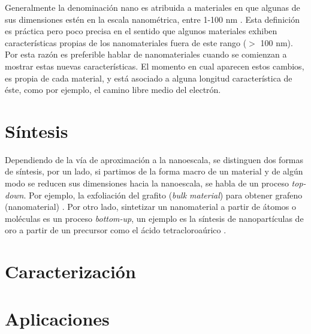 
Generalmente la denominación nano es atribuida a materiales en que algunas de sus dimensiones estén en la escala nanométrica, entre 1-100 nm \citep{Gressler2013}. Esta definición es práctica pero poco precisa en el sentido que algunos materiales exhiben características propias de los nanomateriales fuera de este rango ($>$ 100 nm). Por esta razón es preferible hablar de nanomateriales cuando se comienzan a mostrar estas nuevas características. El momento en cual aparecen estos cambios, es propia de cada material, y está asociado a alguna longitud característica de éste, como por ejemplo, el camino libre medio del electrón.

\section{Síntesis}
Dependiendo de la vía de aproximación a la nanoescala, se distinguen dos formas de síntesis, por un lado, si partimos de la forma macro de un material y de algún modo se reducen sus dimensiones hacia la nanoescala, se habla de un proceso \textit{top-down}. Por ejemplo, la exfoliación del grafito (\textit{bulk material}) para obtener grafeno (nanomaterial) \citep{Novoselov2004}.  Por otro lado, sintetizar un nanomaterial a partir de átomos o moléculas es un proceso \textit{bottom-up}, un ejemplo es la síntesis de nanopartículas de oro a partir de un precursor como el ácido tetracloroaúrico \citep{Daniel2004}.

\section{Caracterización}


\section{Aplicaciones}

